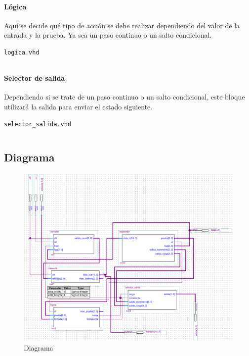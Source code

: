 \documentclass[table]{scrartcl}
\newenvironment{code}{\captionsetup{type=listing}}{}
\begin{document}
\paragraph{Lógica}

Aquí se decide qué tipo de acción se debe realizar dependiendo del valor de la
entrada y la prueba. Ya sea un paso continuo o un salto condicional.
\begin{code}
  \caption{\texttt{logica.vhd}}
  \inputminted{vhdl}{./logica.vhd}
\end{code}

\paragraph{Selector de salida}

Dependiendo si se trate de un paso continuo o un salto condicional, este bloque
utilizará la salida para enviar el estado siguiente.
\begin{code}
  \caption{\texttt{selector_salida.vhd}}
  \inputminted{vhdl}{./selector_salida.vhd}
\end{code}

\subsection{Diagrama}\label{sec:diagrama}
\begin{figure}[H]
    \centering
    \includegraphics[width=\textwidth]{./img/dia}
    \caption{Diagrama}
\end{figure}
\end{document}
